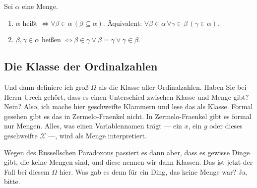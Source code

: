 \begin{math-stroke}[Ordinalzahlen]
Sei $\alpha$ eine Menge.
\begin{enumerate}[label=\textbf{(\roman*)}]
    \item $\alpha$ heißt  $\iff \forall \beta \in \alpha \, (\beta \subseteq \alpha)$.
    Äquivalent: $\forall \beta \in \alpha \, \forall \gamma \in \beta \, (\gamma \in \alpha)$.
    \item $\beta, \gamma \in \alpha$ heißen  $\iff \beta \in \gamma \lor \beta = \gamma \lor \gamma \in \beta$.
\end{enumerate}

\end{math-stroke}

\subsection{Die Klasse der Ordinalzahlen}

\begin{spoken-clean}[00:30:10 - 00:31:29]
Und dann definiere ich groß $\Omega$ als die Klasse aller Ordinalzahlen. Haben Sie bei Herrn Urech gehört, dass es einen Unterschied zwischen Klasse und Menge gibt? Nein? Also, ich mache hier geschweifte Klammern und lese das als Klasse. Formal gesehen gibt es das in Zermelo-Fraenkel nicht. In Zermelo-Fraenkel gibt es formal nur Mengen. Alles, was einen Variablennamen trägt --- ein $x$, ein $y$ oder dieses geschweifte $\mathcal{X}$ ---, wird als Menge interpretiert.

Wegen des Russellschen Paradoxons passiert es dann aber, dass es gewisse Dinge gibt, die keine Mengen sind, und diese nennen wir dann Klassen. Das ist jetzt der Fall bei diesem $\Omega$ hier. Was gab es denn für ein Ding, das keine Menge war? Ja, bitte.
\end{spoken-clean}

